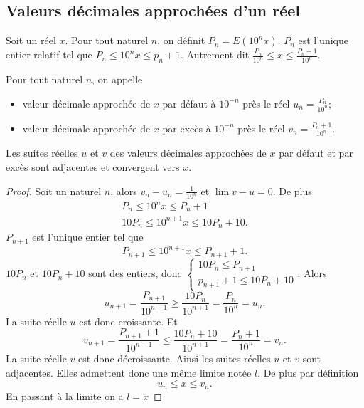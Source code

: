 \subsection{Valeurs décimales approchées d'un réel}

Soit un réel $x$. Pour tout naturel $n$, on définit $P_n=E(10^n x)$. $P_n$ est l'unique entier relatif tel que $P_n \leq 10^n x \leq p_n+1$. Autrement dit $\frac{P_n}{10^n} \leq x \leq \frac{P_n+1}{10^n}$.
\begin{defdef}
  Pour tout naturel $n$, on appelle 
  \begin{itemize}
  \item valeur décimale approchée de $x$ par défaut à $10^{-n}$ près le réel $u_n = \frac{P_n}{10^n}$;
  \item valeur décimale approchée de $x$ par excès  à $10^{-n}$ près le réel $v_n = \frac{P_n+1}{10^n}$.
  \end{itemize}
\end{defdef}
\begin{prop}
  Les suites réelles $u$ et $v$ des valeurs décimales approchées de $x$ par défaut et par excès sont adjacentes et convergent vers $x$.
\end{prop}
\begin{proof}
  Soit un naturel $n$, alors $v_n-u_n=\frac{1}{10^n}$ et $\lim v-u=0$. De plus
  \begin{align}
    P_n \leq 10^n x \leq P_n +1 \\
    10 P_n \leq 10^{n+1} x \leq 10 P_n +10.
  \end{align}
  $P_{n+1}$ est l'unique entier tel que
  \begin{equation}
    P_{n+1} \leq 10^{n+1} x \leq P_{n+1}+1.
  \end{equation}
$10P_n$ et $10P_n +10$ sont des entiers, donc $\begin{cases} 10 P_n \leq P_{n+1} \\ p_{n+1}+1 \leq 10 P_n +10\end{cases}$. Alors 
\begin{equation}
u_{n+1} = \frac{P_{n+1}}{10^{n+1}} \geq \frac{10 P_n}{10^{n+1}} = \frac{P_n}{10^n}=u_n.
\end{equation}
 La suite réelle $u$ est donc croissante. Et
\begin{equation}
v_{n+1} = \frac{P_{n+1}+1}{10^{n+1}} \leq \frac{10 P_n+10}{10^{n+1}} = \frac{P_n+1}{10^n}= v_n.
\end{equation}
La suite réelle $v$ est donc décroissante. Ainsi les suites réelles $u$ et $v$ sont adjacentes. Elles admettent donc une même limite notée $l$. De plus par définition
\begin{equation}
  u_n \leq x \leq v_n.
\end{equation}
En passant à la limite on a $l=x$
\end{proof}
